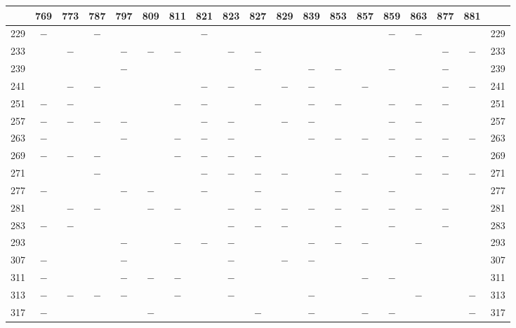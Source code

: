\clearpage
{}%
\begin{center}\begingroup\fontsize{8}{10.5}\selectfont\setlength{\tabcolsep}{2pt}
\begin{tabular}{r|c|c|c|c|c|c|c|c|c|c|c|c|c|c|c|c|c|r}
\hline
 & 769 & 773 & 787 & 797 & 809 & 811 & 821 & 823 & 827 & 829 & 839 & 853 & 857 & 859 & 863 & 877 & 881 & \\
\hline
229 & $-$ &  & $-$ &  &  &  & $-$ &  &  &  &  &  &  & $-$ & $-$ &  &  & 229\\
233 &  & $-$ &  & $-$ & $-$ & $-$ &  & $-$ & $-$ &  &  &  &  &  &  & $-$ & $-$ & 233\\
239 &  &  &  & $-$ &  &  &  &  & $-$ &  & $-$ & $-$ &  & $-$ &  & $-$ &  & 239\\
241 &  & $-$ & $-$ &  &  &  & $-$ & $-$ &  & $-$ & $-$ &  & $-$ &  &  & $-$ & $-$ & 241\\
251 & $-$ & $-$ &  &  &  & $-$ & $-$ &  & $-$ &  & $-$ & $-$ &  & $-$ & $-$ & $-$ &  & 251\\
257 & $-$ & $-$ & $-$ & $-$ &  &  & $-$ & $-$ &  & $-$ & $-$ &  &  & $-$ & $-$ &  &  & 257\\
263 & $-$ &  &  & $-$ &  & $-$ & $-$ & $-$ &  &  & $-$ & $-$ & $-$ & $-$ & $-$ & $-$ & $-$ & 263\\
269 & $-$ & $-$ & $-$ &  &  & $-$ & $-$ & $-$ & $-$ &  &  &  &  & $-$ & $-$ & $-$ &  & 269\\
271 &  &  & $-$ &  &  &  & $-$ & $-$ & $-$ & $-$ &  & $-$ & $-$ &  & $-$ & $-$ & $-$ & 271\\
277 & $-$ &  &  & $-$ & $-$ &  & $-$ &  & $-$ &  &  & $-$ &  & $-$ &  &  &  & 277\\
281 &  & $-$ & $-$ &  & $-$ & $-$ &  & $-$ & $-$ & $-$ & $-$ & $-$ & $-$ & $-$ & $-$ & $-$ &  & 281\\
283 & $-$ & $-$ &  &  &  &  &  & $-$ & $-$ & $-$ &  & $-$ &  & $-$ &  & $-$ &  & 283\\
293 &  &  &  & $-$ &  & $-$ & $-$ & $-$ &  &  & $-$ & $-$ & $-$ &  & $-$ &  &  & 293\\
307 & $-$ &  &  & $-$ &  &  &  & $-$ &  & $-$ & $-$ &  &  &  &  &  &  & 307\\
311 & $-$ &  &  & $-$ & $-$ & $-$ &  & $-$ &  &  &  &  & $-$ & $-$ &  &  &  & 311\\
313 & $-$ & $-$ & $-$ & $-$ &  & $-$ &  & $-$ &  &  & $-$ &  &  &  & $-$ &  & $-$ & 313\\
317 & $-$ &  &  &  & $-$ &  &  &  & $-$ &  & $-$ &  & $-$ & $-$ &  &  & $-$ & 317\\

\end{tabular}
\end{center}
